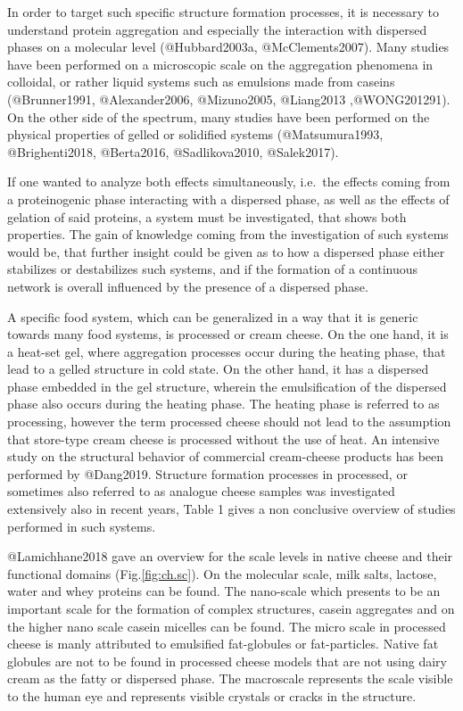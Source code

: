 \documentclass[
]{article}
\begin{document}
In order to target such specific structure formation processes, it is
necessary to understand protein aggregation and especially the
interaction with dispersed phases on a molecular level (@Hubbard2003a,
@McClements2007). Many studies have been performed on a microscopic
scale on the aggregation phenomena in colloidal, or rather liquid
systems such as emulsions made from caseins (@Brunner1991,
@Alexander2006, @Mizuno2005, @Liang2013 ,@WONG201291). On the other side
of the spectrum, many studies have been performed on the physical
properties of gelled or solidified systems (@Matsumura1993,
@Brighenti2018, @Berta2016, @Sadlikova2010, @Salek2017).

If one wanted to analyze both effects simultaneously, i.e.~the effects
coming from a proteinogenic phase interacting with a dispersed phase, as
well as the effects of gelation of said proteins, a system must be
investigated, that shows both properties. The gain of knowledge coming
from the investigation of such systems would be, that further insight
could be given as to how a dispersed phase either stabilizes or
destabilizes such systems, and if the formation of a continuous network
is overall influenced by the presence of a dispersed phase.

A specific food system, which can be generalized in a way that it is
generic towards many food systems, is processed or cream cheese. On the
one hand, it is a heat-set gel, where aggregation processes occur during
the heating phase, that lead to a gelled structure in cold state. On the
other hand, it has a dispersed phase embedded in the gel structure,
wherein the emulsification of the dispersed phase also occurs during the
heating phase. The heating phase is referred to as processing, however
the term processed cheese should not lead to the assumption that
store-type cream cheese is processed without the use of heat. An
intensive study on the structural behavior of commercial cream-cheese
products has been performed by @Dang2019. Structure formation processes
in processed, or sometimes also referred to as analogue cheese samples
was investigated extensively also in recent years, Table 1 gives a non
conclusive overview of studies performed in such systems.

@Lamichhane2018 gave an overview for the scale levels in native cheese
and their functional domains (Fig.\ref{fig:ch.sc}). On the molecular
scale, milk salts, lactose, water and whey proteins can be found. The
nano-scale which presents to be an important scale for the formation of
complex structures, casein aggregates and on the higher nano scale
casein micelles can be found. The micro scale in processed cheese is
manly attributed to emulsified fat-globules or fat-particles. Native fat
globules are not to be found in processed cheese models that are not
using dairy cream as the fatty or dispersed phase. The macroscale
represents the scale visible to the human eye and represents visible
crystals or cracks in the structure.
\end{document}
